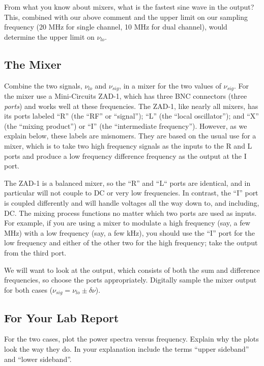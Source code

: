 \documentclass[11pt,preprint]{aastex}
\begin{document}
        From what you know about mixers, what is the fastest sine wave
in the output? This, combined with our above comment and the upper limit
on our sampling frequency (20 MHz for single channel, 10 MHz for dual
channel), would determine the upper limit on $\nu_{lo}$.

\subsection{The Mixer}

Combine the two signals, $\nu_{lo}$ and $\nu_{sig}$, in a mixer for the
two values of $\nu_{sig}$.  For the mixer use a Mini-Circuits
ZAD-1, which has three BNC connectors (three {\it ports}) and works well
at these frequencies.  The ZAD-1, like nearly all mixers, has its ports
labeled ``R'' (the ``RF'' or ``signal''); ``L'' (the ``local
oscillator''); and ``X'' (the ``mixing product'') or ``I'' (the
``intermediate frequency'').  However, as we explain below, these labels
are misnomers.  They are based on the usual use for a mixer, which is to
take two high frequency signals as the inputs to the R and L ports and
produce a low frequency difference frequency as the output at the I
port.

        The ZAD-1 is a balanced mixer, so the ``R'' and ``L`` ports are
identical, and in particular will not couple to DC or very low
frequencies.  In contrast, the ``I'' port is coupled differently and
will handle voltages all the way down to, and including, DC.  The mixing
process functions no matter which two ports are used as inputs.  For
example, if you are using a mixer to modulate a high frequency (say, a
few MHz) with a low frequency (say, a few kHz), you should use the ``I''
port for the low frequency and either of the other two for the high
frequency; take the output from the third port.

We will want to look at the output, which consists of both the sum
and difference frequencies, so choose the ports appropriately. Digitally
sample the mixer output for both cases ($\nu_{sig} = \nu_{lo} \pm \delta
\nu$).

\subsection{For Your Lab Report} \label{digsamp}

        For the two cases, plot the power spectra versus
frequency. Explain why the plots look the way they do. In your
explanation include the terms ``upper sideband'' and ``lower sideband''.
\end{document}
